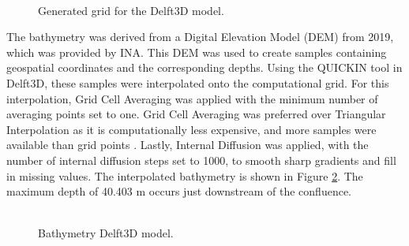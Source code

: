 \begin{figure}[h]
    \centering
    \includegraphics[width=0.75, height=7cm\linewidth]{figures/ch7/Grid_Guazu.png}
    \caption{Generated grid for the Delft3D model.}
    \label{fig: Grid Guazu Delft3D}
\end{figure}

The bathymetry was derived from a Digital Elevation Model (DEM) from 2019, which was provided by INA. This DEM was used to create samples containing geospatial coordinates and the corresponding depths. Using the QUICKIN tool in Delft3D, these samples were interpolated onto the computational grid. For this interpolation, Grid Cell Averaging was applied with the minimum number of averaging points set to one. Grid Cell Averaging was preferred over Triangular Interpolation as it is computationally less expensive, and more samples were available than grid points \autocite{deltaresQUICKINUserManual2025}. Lastly, Internal Diffusion was applied, with the number of internal diffusion steps set to 1000, to smooth sharp gradients and fill in missing values. The interpolated bathymetry is shown in Figure \ref{fig: Bathymetry Delft3D}. The maximum depth of 40.403 m occurs just downstream of the confluence. 

\begin{figure}[H]
    \centering
    \includegraphics[width=0.75, height =7cm\linewidth]{figures/ch7/Bathymetry_Gueazu_Delft3D.png}
    \caption{Bathymetry Delft3D model.}
    \label{fig: Bathymetry Delft3D}
\end{figure}

